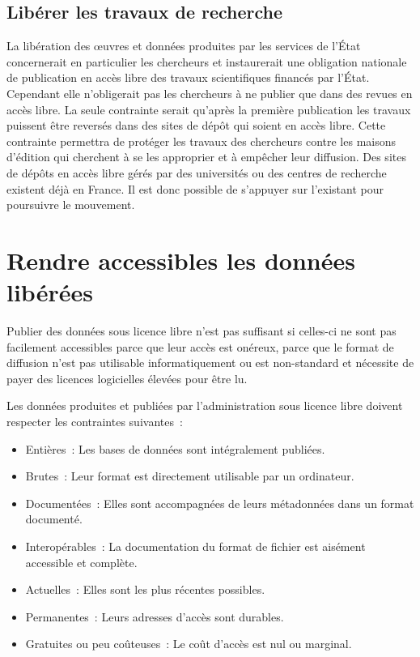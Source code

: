 \subsection{Libérer les travaux de recherche}

La libération des œuvres et données produites par les services de l'État concernerait en particulier les chercheurs et instaurerait une obligation nationale de publication en accès libre des travaux scientifiques financés par l'État. Cependant elle n'obligerait pas les chercheurs à ne publier que dans des revues en accès libre. La seule contrainte serait qu'après la première publication les travaux puissent être reversés dans des sites de dépôt qui soient en accès libre.  Cette contrainte permettra de protéger les travaux des chercheurs contre les maisons d'édition qui cherchent à se les approprier et à empêcher leur diffusion. Des sites de dépôts en accès libre gérés par des universités ou des centres de recherche existent déjà en France. Il est donc possible de s'appuyer sur l'existant pour poursuivre le mouvement.

 \section{Rendre accessibles les données libérées}
Publier des données sous licence libre n'est pas suffisant si celles-ci ne sont pas facilement accessibles parce que leur accès est onéreux, parce que le format de diffusion n'est pas utilisable informatiquement ou est non-standard et nécessite de payer des licences logicielles élevées pour être lu.

\begin{mesure}
Les données produites et publiées par l'administration sous licence libre doivent respecter les contraintes suivantes~:

\begin{itemize}
\item Entières~: Les bases de données sont intégralement publiées.
\item Brutes~: Leur format est directement utilisable par un ordinateur.
\item Documentées~: Elles sont accompagnées de leurs métadonnées dans un format documenté.
\item Interopérables~: La documentation du format de fichier est aisément accessible et complète. 
\item Actuelles~: Elles sont les plus récentes possibles.
\item Permanentes~: Leurs adresses d'accès sont durables.
\item Gratuites ou peu coûteuses~: Le coût d'accès est nul ou marginal.
\end{itemize}
\end{mesure}

